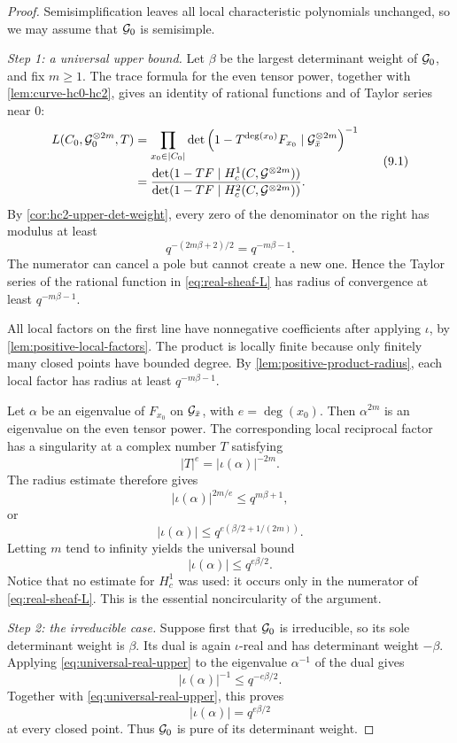 \begin{proof}
Semisimplification leaves all local characteristic polynomials unchanged,
so we may assume that \(\mathcal G_0\) is semisimple.

\medskip
\noindent\emph{Step 1: a universal upper bound.}
Let \(\beta\) be the largest determinant weight of \(\mathcal G_0\), and fix
\(m\geq1\).  The trace formula for the even tensor power, together with
\cref{lem:curve-hc0-hc2}, gives an identity of rational functions and of
Taylor series near \(0\):
\[
\begin{split}
 L(C_0,\mathcal G_0^{\otimes 2m},T)
 &=
 \prod_{x_0\in|C_0|}
 \det\left(1-T^{\deg(x_0)}F_{x_0}\mid
 \mathcal G_{\bar x}^{\otimes 2m}\right)^{-1}\\
 &=
 \frac{
 \det(1-TF\mid H_c^1(C,\mathcal G^{\otimes 2m}))
 }{
 \det(1-TF\mid H_c^2(C,\mathcal G^{\otimes 2m}))
 }.
\end{split}
\tag{9.1}
\label{eq:real-sheaf-L}
\]
By \cref{cor:hc2-upper-det-weight}, every zero of the denominator on the
right has modulus at least
\[
  q^{-(2m\beta+2)/2}=q^{-m\beta-1}.
\]
The numerator can cancel a pole but cannot create a new one.  Hence the
Taylor series of the rational function in \eqref{eq:real-sheaf-L} has
radius of convergence at least \(q^{-m\beta-1}\).

All local factors on the first line have nonnegative coefficients after
applying \(\iota\), by \cref{lem:positive-local-factors}.  The product is
locally finite because only finitely many closed points have bounded
degree.  By \cref{lem:positive-product-radius}, each local factor has
radius at least \(q^{-m\beta-1}\).

Let \(\alpha\) be an eigenvalue of \(F_{x_0}\) on
\(\mathcal G_{\bar x}\), with \(e=\deg(x_0)\).  Then \(\alpha^{2m}\) is an
eigenvalue on the even tensor power.  The corresponding local reciprocal
factor has a singularity at a complex number \(T\) satisfying
\[
  |T|^e=|\iota(\alpha)|^{-2m}.
\]
The radius estimate therefore gives
\[
  |\iota(\alpha)|^{2m/e}
  \leq q^{m\beta+1},
\]
or
\[
  |\iota(\alpha)|
  \leq q^{e(\beta/2+1/(2m))}.
\]
Letting \(m\) tend to infinity yields the universal bound
\[
  |\iota(\alpha)|\leq q^{e\beta/2}.
\tag{9.2}
\label{eq:universal-real-upper}
\]
Notice that no estimate for \(H_c^1\) was used: it occurs only in the
numerator of \eqref{eq:real-sheaf-L}.  This is the essential
noncircularity of the argument.

\medskip
\noindent\emph{Step 2: the irreducible case.}
Suppose first that \(\mathcal G_0\) is irreducible, so its sole determinant
weight is \(\beta\).  Its dual is again \(\iota\)-real and has determinant
weight \(-\beta\).  Applying \eqref{eq:universal-real-upper} to the
eigenvalue \(\alpha^{-1}\) of the dual gives
\[
  |\iota(\alpha)|^{-1}\leq q^{-e\beta/2}.
\]
Together with \eqref{eq:universal-real-upper}, this proves
\[
  |\iota(\alpha)|=q^{e\beta/2}
\]
at every closed point.  Thus \(\mathcal G_0\) is pure of its determinant weight.


\end{proof}
